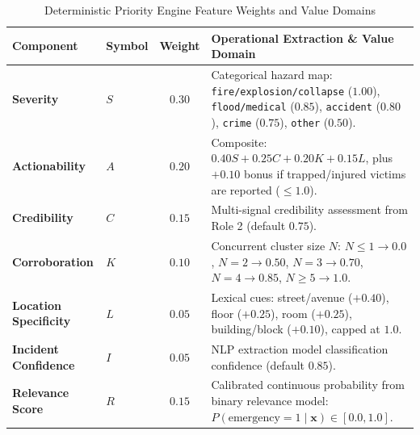 \documentclass[10pt,a4paper]{article}
\begin{document}
\begin{table}[htbp]
  \centering
  \small
  \caption{Deterministic Priority Engine Feature Weights and Value Domains}
  \label{tab:priority_features}
  \begin{tabularx}{\textwidth}{llcX}
    \toprule
    \textbf{Component} & \textbf{Symbol} & \textbf{Weight} & \textbf{Operational Extraction \& Value Domain} \\
    \midrule
    \textbf{Severity} & $S$ & $0.30$ & Categorical hazard map: \texttt{fire/explosion/collapse} ($1.00$), \texttt{flood/medical} ($0.85$), \texttt{accident} ($0.80$), \texttt{crime} ($0.75$), \texttt{other} ($0.50$). \\
    \textbf{Actionability} & $A$ & $0.20$ & Composite: $0.40S + 0.25C + 0.20K + 0.15L$, plus $+0.10$ bonus if trapped/injured victims are reported ($\le 1.0$). \\
    \textbf{Credibility} & $C$ & $0.15$ & Multi-signal credibility assessment from Role 2 (default $0.75$). \\
    \textbf{Corroboration} & $K$ & $0.10$ & Concurrent cluster size $N$: $N \le 1 \to 0.0$, $N=2 \to 0.50$, $N=3 \to 0.70$, $N=4 \to 0.85$, $N \ge 5 \to 1.0$. \\
    \textbf{Location Specificity} & $L$ & $0.05$ & Lexical cues: street/avenue ($+0.40$), floor ($+0.25$), room ($+0.25$), building/block ($+0.10$), capped at $1.0$. \\
    \textbf{Incident Confidence} & $I$ & $0.05$ & NLP extraction model classification confidence (default $0.85$). \\
    \textbf{Relevance Score} & $R$ & $0.15$ & Calibrated continuous probability from binary relevance model: $P(\text{emergency}=1 \mid \mathbf{x}) \in [0.0, 1.0]$. \\
    \bottomrule
  \end{tabularx}
\end{table}
\end{document}
